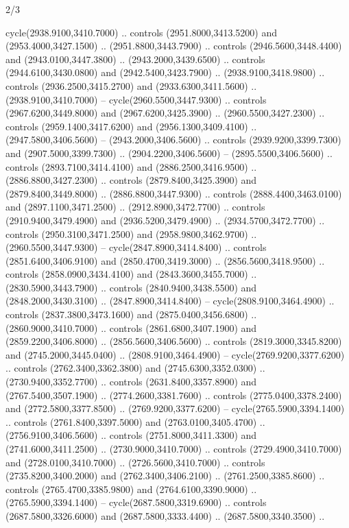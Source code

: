 \begin{flagdescription}{2/3}
\begin{scope}[shift={(0.5\flaglength,0.5)},scale=\flagwidth/130]
\begin{scope}[y=0.01mm, x=0.01mm,shift={(-3365,-2250)}]
  cycle(2938.9100,3410.7000) .. controls (2951.8000,3413.5200) and
  (2953.4000,3427.1500) .. (2951.8800,3443.7900) .. controls
  (2946.5600,3448.4400) and (2943.0100,3447.3800) .. (2943.2000,3439.6500) ..
  controls (2944.6100,3430.0800) and (2942.5400,3423.7900) ..
  (2938.9100,3418.9800) .. controls (2936.2500,3415.2700) and
  (2933.6300,3411.5600) .. (2938.9100,3410.7000) -- cycle(2960.5500,3447.9300)
  .. controls (2967.6200,3449.8000) and (2967.6200,3425.3900) ..
  (2960.5500,3427.2300) .. controls (2959.1400,3417.6200) and
  (2956.1300,3409.4100) .. (2947.5800,3406.5600) -- (2943.2000,3406.5600) ..
  controls (2939.9200,3399.7300) and (2907.5000,3399.7300) ..
  (2904.2200,3406.5600) -- (2895.5500,3406.5600) .. controls
  (2893.7100,3414.4100) and (2886.2500,3416.9500) .. (2886.8800,3427.2300) ..
  controls (2879.8400,3425.3900) and (2879.8400,3449.8000) ..
  (2886.8800,3447.9300) .. controls (2888.4400,3463.0100) and
  (2897.1100,3471.2500) .. (2912.8900,3472.7700) .. controls
  (2910.9400,3479.4900) and (2936.5200,3479.4900) .. (2934.5700,3472.7700) ..
  controls (2950.3100,3471.2500) and (2958.9800,3462.9700) ..
  (2960.5500,3447.9300) -- cycle(2847.8900,3414.8400) .. controls
  (2851.6400,3406.9100) and (2850.4700,3419.3000) .. (2856.5600,3418.9500) ..
  controls (2858.0900,3434.4100) and (2843.3600,3455.7000) ..
  (2830.5900,3443.7900) .. controls (2840.9400,3438.5500) and
  (2848.2000,3430.3100) .. (2847.8900,3414.8400) -- cycle(2808.9100,3464.4900)
  .. controls (2837.3800,3473.1600) and (2875.0400,3456.6800) ..
  (2860.9000,3410.7000) .. controls (2861.6800,3407.1900) and
  (2859.2200,3406.8000) .. (2856.5600,3406.5600) .. controls
  (2819.3000,3345.8200) and (2745.2000,3445.0400) .. (2808.9100,3464.4900) --
  cycle(2769.9200,3377.6200) .. controls (2762.3400,3362.3800) and
  (2745.6300,3352.0300) .. (2730.9400,3352.7700) .. controls
  (2631.8400,3357.8900) and (2767.5400,3507.1900) .. (2774.2600,3381.7600) ..
  controls (2775.0400,3378.2400) and (2772.5800,3377.8500) ..
  (2769.9200,3377.6200) -- cycle(2765.5900,3394.1400) .. controls
  (2761.8400,3397.5000) and (2763.0100,3405.4700) .. (2756.9100,3406.5600) ..
  controls (2751.8000,3411.3300) and (2741.6000,3411.2500) ..
  (2730.9000,3410.7000) .. controls (2729.4900,3410.7000) and
  (2728.0100,3410.7000) .. (2726.5600,3410.7000) .. controls
  (2735.8200,3400.2000) and (2762.3400,3406.2100) .. (2761.2500,3385.8600) ..
  controls (2765.4700,3385.9800) and (2764.6100,3390.9000) ..
  (2765.5900,3394.1400) -- cycle(2687.5800,3319.6900) .. controls
  (2687.5800,3326.6000) and (2687.5800,3333.4400) .. (2687.5800,3340.3500) ..

\end{scope}
\end{scope}
\end{flagdescription}
